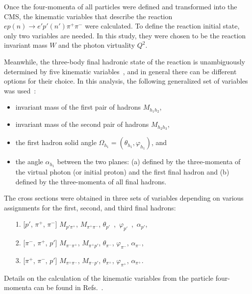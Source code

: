 \documentclass[prc,twocolumn,superscriptaddress,showpacs,amssymb,amsmath,amsfonts,aps,nofootinbib]{revtex4-1}
\begin{document}
Once the four-momenta of all particles were defined and transformed into the CMS, the kinematic variables that describe the reaction $ep(n) \rightarrow e'p'(n')\pi^{+}\pi^{-}$ were calculated. To define the reaction initial state, only two variables are needed. In this study, they were chosen to be the reaction invariant mass $W$ and the photon virtuality $Q^{2}$.

Meanwhile, the three-body final hadronic state of the reaction is unambiguously determined by five kinematic variables~\cite{Fed_an_note:2017}, and in general there can be different options for their choice. In this analysis, the following generalized set of variables was used~\cite{Fed_an_note:2017,Fed_paper_2018,Byckling:1971vca,Isupov:2017lnd,Fedotov:2008aa,Mokeev:2015lda,my_an_note:2020, my_thesis:2021}:

\begin{itemize}
\item invariant mass of the first pair of hadrons $M_{h_{1}h_{2}}$,
\item invariant mass of the second pair of hadrons $M_{h_{2}h_{3}}$,
\item the first hadron solid angle $\Omega_{h_{1}}\! \!=\! (\theta_{h_{1}}, \varphi_{h_{1}})$, and
\item the angle $\alpha_{h_{1}}$ between the two planes: (a) defined by the three-momenta of the virtual photon (or initial proton) and the first final hadron and (b) defined by the three-momenta of all final hadrons.
\end{itemize}

The cross sections were obtained in three sets of variables depending on various assignments for the first, second, and third final hadrons:
\begin{itemize}
\item[1.] [$p'$, $\pi^{+}$, $\pi^{-}$]
$M_{p'\pi^{+}}$, $M_{\pi^{+}\pi^{-}}$, $\theta_{p'}$~,~$\varphi_{p'}$~,~$\alpha_{p'}$,
\item[2.] [$\pi^{-}$, $\pi^{+}$, $p'$]
$M_{\pi^{-}\pi^{+}}$, $M_{\pi^{+}p'}$, $\theta_{\pi^{-}}$, $\varphi_{\pi^{-}}$, $\alpha_{\pi^{-}}$,~
\item[3.]  [$\pi^{+}$, $\pi^{-}$, $p'$]
$M_{\pi^{+}\pi^{-}}$, $M_{\pi^{-}p'}$, $\theta_{\pi^{+}}$, $\varphi_{\pi^{+}}$, $\alpha_{\pi^{+}}$.
\end{itemize}


Details on the calculation of the kinematic variables from the particle four-momenta can be found in Refs.\!~\cite{my_an_note:2020, my_thesis:2021,Fed_an_note:2017,Fedotov:2008aa}.
\end{document}
